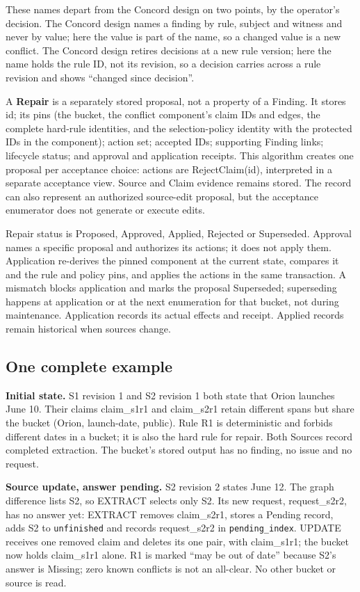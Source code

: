 \documentclass[11pt]{article}
\newcommand{\code}[1]{\texttt{#1}}
\begin{document}
These names depart from the Concord design on two points, by the operator's
decision. The Concord design names a finding by rule, subject and witness and
never by value; here the value is part of the name, so a changed value is a new
conflict. The Concord design retires decisions at a new rule version; here the
name holds the rule ID, not its revision, so a decision carries across a rule
revision and shows ``changed since decision''.

A \textbf{Repair} is a separately stored proposal, not a property of a Finding.
It stores id; its pins (the bucket, the conflict component's claim IDs and
edges, the complete hard-rule identities, and the selection-policy identity
with the protected IDs in the component); action set; accepted IDs; supporting
Finding links; lifecycle status; and approval and application receipts.
This algorithm creates one proposal per acceptance choice: actions are
RejectClaim(id), interpreted in a separate acceptance view. Source and Claim
evidence remains stored. The record can also represent an authorized source-edit
proposal, but the acceptance enumerator does not generate or execute edits.

Repair status is Proposed, Approved, Applied, Rejected or Superseded.
Approval names a specific proposal and authorizes its actions; it does not
apply them. Application re-derives the pinned component at the current state,
compares it and the rule and policy pins, and applies the actions in the same
transaction. A mismatch blocks application and marks the proposal Superseded;
superseding happens at application or at the next enumeration for that bucket,
not during maintenance. Application records its actual
effects and receipt. Applied records remain historical when sources change.

\subsection{One complete example}

\textbf{Initial state.} S1 revision 1 and S2 revision 1 both state that Orion
launches June 10. Their claims claim\_s1r1 and claim\_s2r1 retain different
spans but share the bucket (Orion, launch-date, public). Rule R1 is
deterministic and forbids different dates in a bucket; it is also the hard rule
for repair. Both Sources record completed extraction. The bucket's stored output
has no finding, no issue and no request.

\textbf{Source update, answer pending.} S2 revision 2 states June 12. The graph
difference lists S2, so EXTRACT selects only S2. Its new request,
request\_s2r2, has no answer yet: EXTRACT removes claim\_s2r1, stores a Pending
record, adds S2 to \code{unfinished} and records request\_s2r2 in
\code{pending\_index}. UPDATE receives one removed claim and deletes its one
pair, with claim\_s1r1; the bucket now holds claim\_s1r1 alone. R1 is marked
``may be out of date'' because S2's answer is Missing; zero known conflicts is
not an all-clear. No other bucket or source is read.
\end{document}
